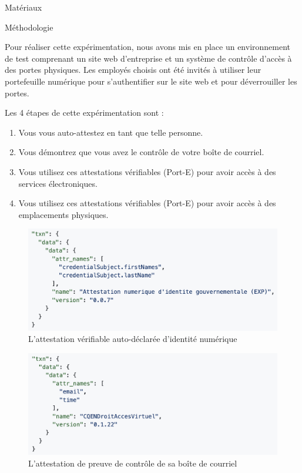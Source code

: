 \documentclass[final]{beamer}
\newlength{\onecolwid}
\begin{document}
\begin{frame}[t]
\begin{columns}[t]
\begin{column}{\onecolwid}
\begin{block}{Matériaux}
\end{block}


\begin{block}{Méthodologie}

Pour réaliser cette expérimentation, nous avons mis en place un environnement de test comprenant un site web d'entreprise et un système de contrôle d'accès à des portes physiques. Les employés choisis ont été invités à utiliser leur portefeuille numérique pour s'authentifier sur le site web et pour déverrouiller les portes.

Les 4 étapes de cette expérimentation sont :
\begin{enumerate}
    \item Vous vous auto-attestez en tant que telle personne.
    \item Vous démontrez que vous avez le contrôle de votre boîte de courriel.
    \item Vous utilisez ces attestations vérifiables (Port-E) pour avoir accès à des services électroniques.
    \item Vous utilisez ces attestations vérifiables (Port-E) pour avoir accès à des emplacements physiques.
\end{enumerate}

\begin{figure}
\includegraphics[width=1.0\linewidth]{Port-E_data01.png}
\caption{ L'attestation vérifiable auto-déclarée d'identité numérique} 
\end{figure}

\begin{figure}
\includegraphics[width=1.0\linewidth]{Port-E_data02.png}
\caption{ L'attestation de preuve de contrôle de sa boîte de courriel} 
\end{figure}


\end{block}
\end{column}
\end{columns}
\end{frame}
\end{document}
